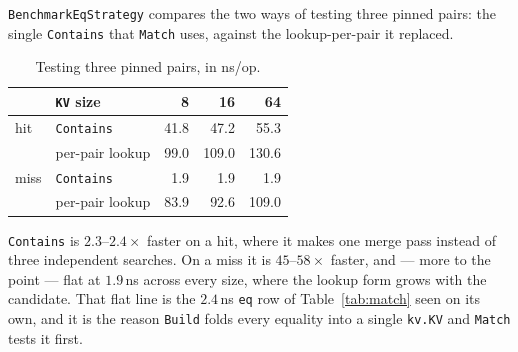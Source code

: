 \documentclass[11pt]{article}
\newcommand{\code}[1]{\texttt{#1}}
\begin{document}
\code{BenchmarkEqStrategy} compares the two ways of testing three pinned pairs:
the single \code{Contains} that \code{Match} uses, against the lookup-per-pair
it replaced.

\begin{table}[h]
\centering
\begin{tabular}{llrrr}
\hline
 & \code{KV} size & 8 & 16 & 64 \\
\hline
hit  & \code{Contains}  & 41.8 & 47.2 & 55.3 \\
     & per-pair lookup  & 99.0 & 109.0 & 130.6 \\
\hline
miss & \code{Contains}  &  1.9 &  1.9 &  1.9 \\
     & per-pair lookup  & 83.9 & 92.6 & 109.0 \\
\hline
\end{tabular}
\caption{Testing three pinned pairs, in ns/op.}
\label{tab:eq}
\end{table}

\code{Contains} is $2.3$--$2.4\times$ faster on a hit, where it makes one merge
pass instead of three independent searches. On a miss it is $45$--$58\times$
faster,
and --- more to the point --- flat at $1.9$\,ns across every size, where the
lookup form grows with the candidate. That flat line is the $2.4$\,ns
\code{eq} row of Table~\ref{tab:match} seen on its own, and it is the reason
\code{Build} folds every equality into a single \code{kv.KV} and \code{Match}
tests it first.
\end{document}
